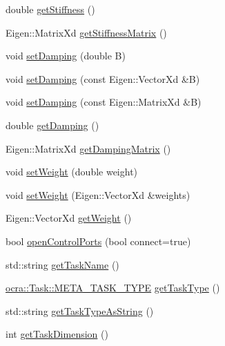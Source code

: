 \begin{DoxyCompactItemize}
double \hyperlink{classocra__recipes_1_1TaskConnection_a88bda0e9df65e379e1b7f5b89929fdde}{get\+Stiffness} ()
\item 
Eigen\+::\+Matrix\+Xd \hyperlink{classocra__recipes_1_1TaskConnection_abbcaa5c1769afc4e4074486fe4fb319a}{get\+Stiffness\+Matrix} ()
\item 
void \hyperlink{classocra__recipes_1_1TaskConnection_a4f9c4b7b99c41c817b5c9448464b84bc}{set\+Damping} (double B)
\item 
void \hyperlink{classocra__recipes_1_1TaskConnection_ae831590f6b0139cfaff4e54286dc4438}{set\+Damping} (const Eigen\+::\+Vector\+Xd \&B)
\item 
void \hyperlink{classocra__recipes_1_1TaskConnection_a143aba34caf53044de8adb6ac94f4e29}{set\+Damping} (const Eigen\+::\+Matrix\+Xd \&B)
\item 
double \hyperlink{classocra__recipes_1_1TaskConnection_a7d659e4a155f8a0942bb71d193b95385}{get\+Damping} ()
\item 
Eigen\+::\+Matrix\+Xd \hyperlink{classocra__recipes_1_1TaskConnection_a4176118231f2c5e17e4f749999c9456e}{get\+Damping\+Matrix} ()
\item 
void \hyperlink{classocra__recipes_1_1TaskConnection_ad833849636700c3174f305d10fcc00bf}{set\+Weight} (double weight)
\item 
void \hyperlink{classocra__recipes_1_1TaskConnection_ad03415eb9f2107be39cb44399fb0afd7}{set\+Weight} (Eigen\+::\+Vector\+Xd \&weights)
\item 
Eigen\+::\+Vector\+Xd \hyperlink{classocra__recipes_1_1TaskConnection_a44930029ade716c0ebbe04fba658cf7e}{get\+Weight} ()
\item 
bool \hyperlink{classocra__recipes_1_1TaskConnection_af80b37e5862169c841e4fec70a354937}{open\+Control\+Ports} (bool connect=true)
\item 
std\+::string \hyperlink{classocra__recipes_1_1TaskConnection_ad33b58e0bf6e0f7051b0187435b014f9}{get\+Task\+Name} ()
\item 
\hyperlink{classocra_1_1Task_a8ddf2840d178ca273e886c9ca95248fe}{ocra\+::\+Task\+::\+M\+E\+T\+A\+\_\+\+T\+A\+S\+K\+\_\+\+T\+Y\+PE} \hyperlink{classocra__recipes_1_1TaskConnection_ac5a29440c295728f97b5a5f6df69924f}{get\+Task\+Type} ()
\item 
std\+::string \hyperlink{classocra__recipes_1_1TaskConnection_aab1504531e1371df092a8c589b100e1c}{get\+Task\+Type\+As\+String} ()
\item 
int \hyperlink{classocra__recipes_1_1TaskConnection_a14a0075a94a7df0f912b7dbd8f56d8e2}{get\+Task\+Dimension} ()

\end{DoxyCompactItemize}
